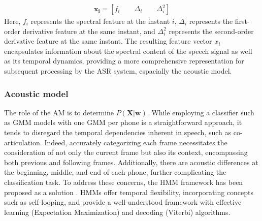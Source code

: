 \begin{align}
    \boldsymbol{x_i} = [f_i \qquad \Delta_i \qquad \Delta^{2}_i]
\end{align}
Here, $f_i$ represents the spectral feature at the instant $i$, $\Delta_i$ represents the first-order derivative feature at the same instant, and $\Delta^2_i$ represents the second-order derivative feature at the same instant. The resulting feature vector $x_i$ encapsulates information about the spectral content of the speech signal as well as its temporal dynamics, providing a more comprehensive representation for subsequent processing by the \ac{ASR} system, espacially the acoustic model.


\subsubsection{Acoustic model}%
The role of the \ac{AM} is to determine $P(\boldsymbol{X}|\boldsymbol{w})$. While employing a classifier such as \ac{GMM} models with one \ac{GMM} per phone is a straightforward approach, it tends to disregard the temporal dependencies inherent in speech, such as co-articulation. Indeed, accurately categorizing each frame necessitates the consideration of not only the current frame but also its context, encompassing both previous and following frames. Additionally, there are acoustic differences at the beginning, middle, and end of each phone, further complicating the classification task. To address these concerns, the \ac{HMM} framework has been proposed as a solution \cite{Dragon_system}. \acp{HMM} offer temporal flexibility, incorporating concepts such as self-looping, and provide a well-understood framework with effective learning (Expectation Maximization) and decoding (Viterbi) algorithms. 


